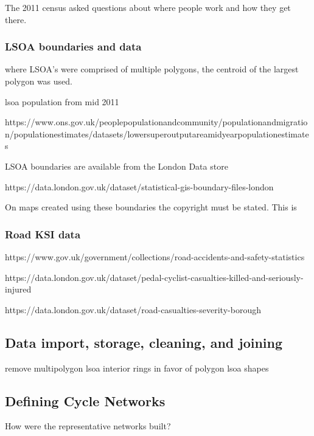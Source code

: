 \documentclass[11pt]{article} %
\begin{document}
The 2011 census asked questions about where people work and how they get there. 

\subsubsection{LSOA boundaries and data}

where LSOA's were comprised of multiple polygons, the centroid of the largest polygon was used. 

lsoa population from mid 2011 

https://www.ons.gov.uk/peoplepopulationandcommunity/populationandmigration/populationestimates/datasets/lowersuperoutputareamidyearpopulationestimates

LSOA boundaries are available from the London Data store

https://data.london.gov.uk/dataset/statistical-gis-boundary-files-london

On maps created using these boundaries the copyright must be stated. This is

\subsubsection{Road KSI data}

https://www.gov.uk/government/collections/road-accidents-and-safety-statistics

https://data.london.gov.uk/dataset/pedal-cyclist-casualties-killed-and-seriously-injured

https://data.london.gov.uk/dataset/road-casualties-severity-borough

\subsection{Data import, storage, cleaning, and joining}

remove multipolygon lsoa interior rings in favor of polygon lsoa shapes

\subsection{Defining Cycle Networks}

How were the representative networks built? 
\end{document}
